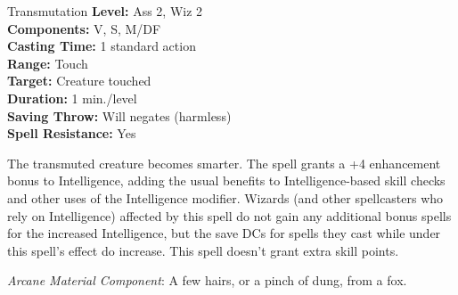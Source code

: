 {Transmutation}
{
	\textbf{Level:}
	Ass 2, Wiz 2\\
	\textbf{Components:}
	V, S, M/DF\\
	\textbf{Casting Time:}
	1 standard action\\
	\textbf{Range:}
	Touch\\
	\textbf{Target:}
	Creature touched\\
	\textbf{Duration:}
	1 min./level\\
	\textbf{Saving Throw:}
	Will negates (harmless)\\
	\textbf{Spell Resistance:}
	Yes\\
}
{
	The transmuted creature becomes smarter. The spell grants a +4 enhancement bonus to Intelligence, adding the usual benefits to Intelligence-based skill checks and other uses of the Intelligence modifier. Wizards (and other spellcasters who rely on Intelligence) affected by this spell do not gain any additional bonus spells for the increased Intelligence, but the save DCs for spells they cast while under this spell's effect do increase. This spell doesn't grant extra skill points.

	\textit{Arcane Material Component}:
	A few hairs, or a pinch of dung, from a fox.

}
